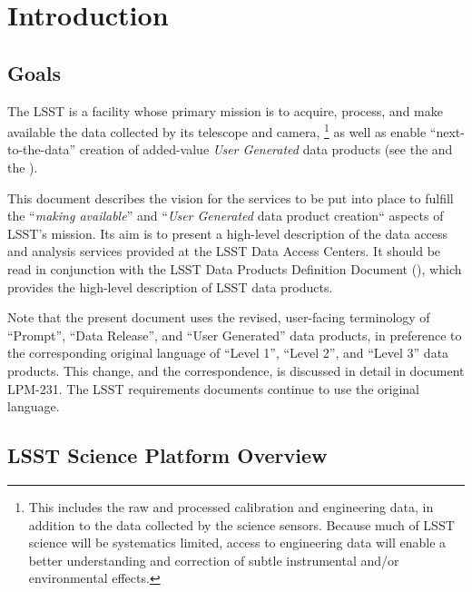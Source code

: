 \section{Introduction\label{sec:intro}}

\subsection{Goals}

The LSST is a facility whose primary mission is to acquire, process, and
make available the data collected by its telescope and camera,
\footnote{This includes the raw and processed calibration and engineering data, in addition to the data collected by the science sensors.
Because much of LSST science will be systematics limited, access to engineering data will enable a better understanding and correction of subtle instrumental and/or environmental effects.}
as well as enable ``next-to-the-data'' creation of added-value \emph{User Generated} data products (see the \SRD and the \LSR).

This document describes the vision for the services to be put into place to
fulfill the ``\emph{making available}'' and ``\emph{User Generated} data product creation``
aspects of LSST's mission. Its aim is to present a high-level
description of the data access and analysis services provided at the
LSST Data Access Centers. It should be read in conjunction with the
LSST Data Products Definition Document (\DPDD), which provides the high-level
description of LSST data products.

Note that the present document uses the revised, user-facing terminology of ``Prompt'', ``Data Release'', and ``User Generated'' data products, in preference to the corresponding original language of ``Level 1'', ``Level 2'', and ``Level 3'' data products.
This change, and the correspondence, is discussed in detail in document LPM-231.
The LSST requirements documents continue to use the original language.

\subsection{LSST Science Platform Overview}

